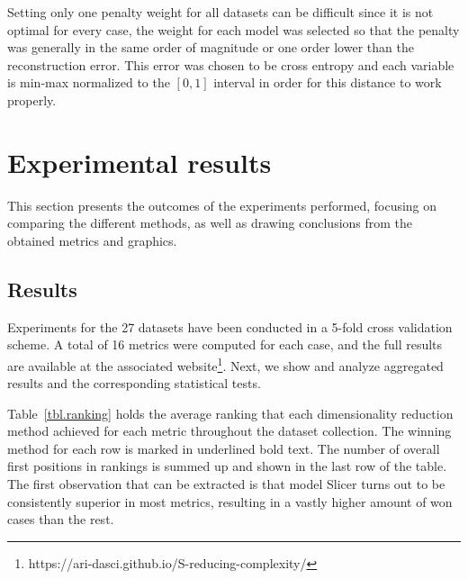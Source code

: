 \documentclass[
	fontsize=11pt, %
	twoside=false, %
	open=any, %
	secnumdepth=1, %
]{kaobook}
\begin{document}
  Setting only one penalty weight for all datasets can be difficult since it is not optimal for every case, the weight for each model was selected so that the penalty was generally in the same order of magnitude or one order lower than the reconstruction error. This error was chosen to be cross entropy and each variable is min-max normalized to the $[0,1]$ interval in order for this distance to work properly.

\fi

\section{Experimental results}\label{sec.experiments}

This section presents the outcomes of the experiments performed, focusing on comparing the different methods, as well as drawing conclusions from the obtained metrics and graphics.



\subsection{Results}

Experiments for the 27 datasets have been conducted in a 5-fold cross validation scheme. A total of 16 metrics were computed for each case, and the full results are available at the associated website\footnote{{https://ari-dasci.github.io/S-reducing-complexity/}}. Next, we show and analyze aggregated results and the corresponding statistical tests.

Table~\ref{tbl.ranking} holds the average ranking that each dimensionality reduction method achieved for each metric throughout the dataset collection. The winning method for each row is marked in underlined bold text. The number of overall first positions in rankings is summed up and shown in the last row of the table. The first observation that can be extracted is that model Slicer turns out to be consistently superior in most metrics, resulting in a vastly higher amount of won cases than the rest.
\end{document}
